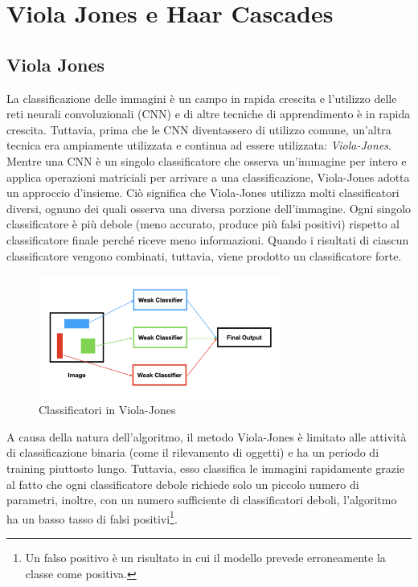 \graphicspath{ {img/4/} }
\chapter{Viola Jones e Haar Cascades}\label{cap:ViolaHaar}
\thispagestyle{empty} %
\newpage

\section{Viola Jones}
\vspace{8mm}

La classificazione delle immagini è un campo in rapida crescita e l'utilizzo delle reti neurali convoluzionali (CNN) e di altre tecniche di apprendimento è in rapida crescita.
Tuttavia, prima che le CNN diventassero di utilizzo comune, un'altra tecnica era ampiamente utilizzata e continua ad essere utilizzata: \emph{Viola-Jones}.
Mentre una CNN è un singolo classificatore che osserva un'immagine per intero e applica operazioni matriciali per arrivare a una classificazione, Viola-Jones adotta un approccio d'insieme. Ciò significa che Viola-Jones utilizza molti classificatori diversi, ognuno dei quali osserva una diversa porzione dell'immagine. Ogni singolo classificatore è più debole (meno accurato, produce più falsi positivi) rispetto al classificatore finale perché riceve meno informazioni. Quando i risultati di ciascun classificatore vengono combinati, tuttavia, viene prodotto un classificatore forte.

\begin{figure}[h!]
	\centering
	\includegraphics[width=80mm]{img/4/violahaar_1_1}
	\caption{\fontsize{10px}{0mm}\selectfont Classificatori in Viola-Jones \label{fig:violahaar_1_1}}
\end{figure}

A causa della natura dell'algoritmo, il metodo Viola-Jones è limitato alle attività di classificazione binaria (come il rilevamento di oggetti) e ha un periodo di training piuttosto lungo. Tuttavia, esso classifica le immagini rapidamente grazie al fatto che ogni classificatore debole richiede solo un piccolo numero di parametri, inoltre, con un numero sufficiente di classificatori deboli, l'algoritmo ha un basso tasso di falsi positivi\footnote{Un falso positivo è un risultato in cui il modello prevede erroneamente la classe come positiva.}.
\newpage
